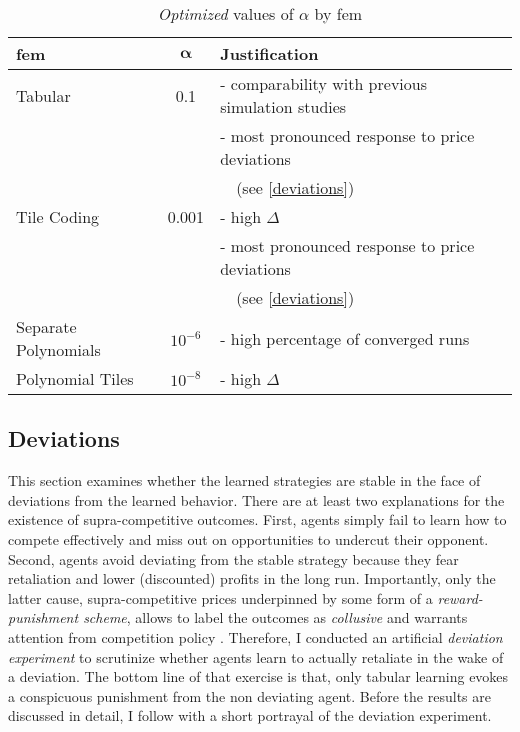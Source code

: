 	\begin{table}
		\centering
		\begin{tabular}{|l|c|l|}
			\hline
			\textbf{\gls{fem}}&$\boldsymbol{\alpha}$&\textbf{Justification} \\
			\hline
			Tabular&0.1&- comparability with previous simulation studies \\
			&&- most pronounced response to price deviations \\
			&& \ \ (see \autoref{deviations}) \\
			\hline
			Tile Coding&0.001&- high $\Delta$ \\
			&&- most pronounced response to price deviations \\
			&&\ \ (see \autoref{deviations}) \\
			\hline
			Separate Polynomials&$10^{-6}$&- high percentage of converged runs \\
			\hline
			Polynomial Tiles&$10^{-8}$&- high $\Delta$ \\
			\hline
		\end{tabular}
		\caption{\emph{Optimized} values of $\alpha$ by \gls{fem}}
		\label{justifications}
	\end{table}



\subsection{Deviations}\label{deviations}

This section examines whether the learned strategies are stable in the face of deviations from the learned behavior. There are at least two explanations for the existence of supra-competitive outcomes. First, agents simply fail to learn how to compete effectively and miss out on opportunities to undercut their opponent. Second, agents avoid deviating from the stable strategy because they fear retaliation and lower (discounted) profits in the long run. Importantly, only the latter cause, supra-competitive prices underpinned by some form of a \emph{reward-punishment scheme}, allows to label the outcomes as \emph{collusive} and warrants attention from competition policy \parencite[p.37]{assad_algorithmic_2020}. 
Therefore, I conducted an artificial \emph{deviation experiment} to scrutinize whether agents learn to actually retaliate in the wake of a deviation. The bottom line of that exercise is that, only tabular learning evokes a conspicuous punishment from the non deviating agent. Before the results are discussed in detail, I follow with a short portrayal of the deviation experiment.

